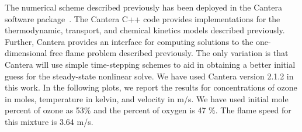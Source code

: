 The numerical scheme described previously has been deployed in the
Cantera software package~\cite{Cantera}. The Cantera C++ code provides
implementations for the thermodynamic, transport, and chemical
kinetics models described previously. Further, Cantera provides an
interface for computing solutions to the one-dimensional free flame
problem described previously. The only variation is that Cantera will
use simple time-stepping schemes to aid in obtaining a better initial
guess for the steady-state nonlinear solve. We have used Cantera
version 2.1.2 in this work. In the following plots, we report the results for concentrations of ozone in moles, temperature in kelvin, and velocity in m/s. We have used initial mole percent of ozone as 53$\%$ and the percent of oxygen is 47 $\%$. The flame speed for this mixture is 3.64 m/s. 

